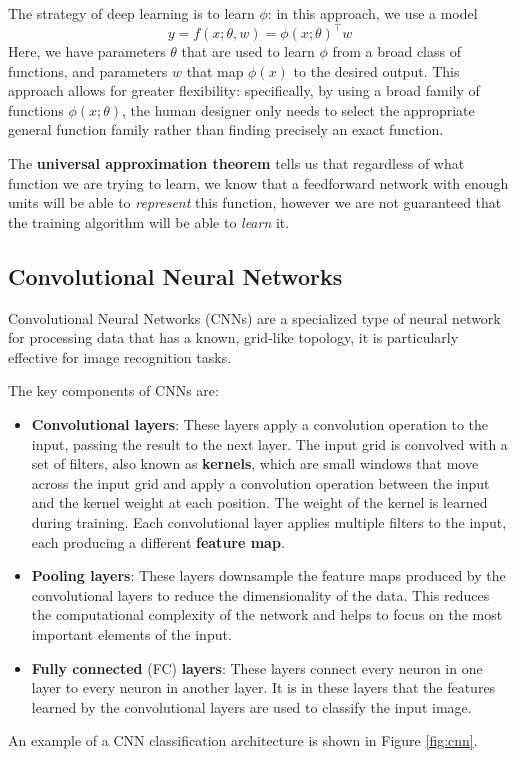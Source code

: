 The strategy of deep learning is to learn \( \phi \):
in this approach, we use a model
\begin{equation}
y = f(x; \theta, w) = \phi(x; \theta)^\top w
\end{equation}
Here, we have parameters \( \theta \) that are used to learn \( \phi \)
from a broad class of functions, and parameters \( w \) that map \( \phi(x) \)
to the desired output.
This approach allows for greater flexibility:
specifically, by using a broad family of functions
\( \phi(x; \theta) \), the human designer only needs to select the appropriate
general function family rather than finding precisely an exact function.

The \textbf{universal approximation theorem} \cite{HORNIK1989359}
tells us that regardless of what function
we are trying to learn, we know that a feedforward network with enough units
will be able to \emph{represent} this
function, however we are not guaranteed that the training algorithm will be able
to \emph{learn} it.

\subsection{Convolutional Neural Networks}

Convolutional Neural Networks (CNNs) are a specialized type of neural network
for processing data that has a known, grid-like topology,
it is particularly effective for image recognition tasks.

The key components of CNNs are:
\begin{itemize}
    \item \textbf{Convolutional layers}: These layers apply a convolution operation
    to the input, passing the result to the next layer.
    The input grid is convolved with a set of filters,
    also known as \textbf{kernels}, which are small windows that move across the input grid
    and apply a convolution operation between the input and the kernel weight
    at each position. The weight of the kernel is learned during training.
    Each convolutional layer applies multiple filters to the input, each producing
    a different \textbf{feature map}.
    \item \textbf{Pooling layers}: These layers downsample the feature maps
    produced by the convolutional layers to reduce the dimensionality of the data.
    This reduces the computational complexity of the network and helps to focus
    on the most important elements of the input.
    \item \textbf{Fully connected} (FC) \textbf{layers}: These layers connect every neuron
    in one layer to every neuron in another layer.
    It is in these layers that the features learned by the convolutional layers
    are used to classify the input image.
\end{itemize}
An example of a CNN classification architecture is shown in Figure \ref{fig:cnn}.

